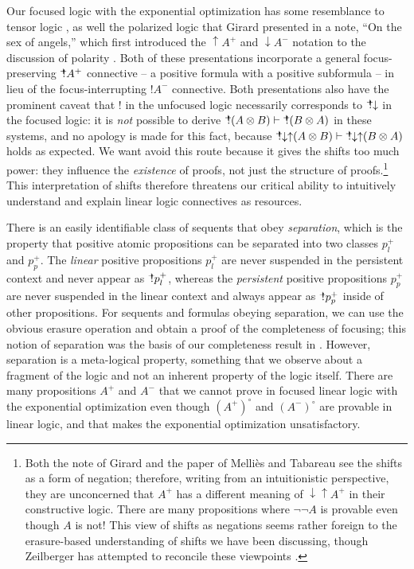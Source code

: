 Our focused logic with the exponential optimization has some resemblance to
tensor logic \cite{mellies10resource}, as well the polarized logic
that Girard presented in a note, ``On the sex of angels,'' which first
introduced the ${\uparrow}A^+$ and ${\downarrow}A^-$ notation to the
discussion of polarity \cite{girard91sex}. Both of these presentations
incorporate a general focus-preserving ${\mbox{\hspace{2pt}$\mathbb !$\hspace{-5pt}$^+$\hspace{-1pt}}}A^+$ connective -- a
positive formula with a positive subformula -- in lieu of the
focus-interrupting ${!}A^-$ connective.  Both presentations also have
the prominent caveat that ${!}$ in the unfocused logic necessarily
corresponds to ${\mbox{\hspace{2pt}$\mathbb !$\hspace{-5pt}$^+$\hspace{-1pt}}}{\downarrow}$ in the focused logic: it is {\it
  not} possible to derive ${\mbox{\hspace{2pt}$\mathbb !$\hspace{-5pt}$^+$\hspace{-1pt}}}(A \otimes B) \vdash {\mbox{\hspace{2pt}$\mathbb !$\hspace{-5pt}$^+$\hspace{-1pt}}}(B
\otimes A)$ in these systems, and no apology is made for this fact,
because ${\mbox{\hspace{2pt}$\mathbb !$\hspace{-5pt}$^+$\hspace{-1pt}}}{\downarrow}{\uparrow}(A \otimes B) \vdash
{\mbox{\hspace{2pt}$\mathbb !$\hspace{-5pt}$^+$\hspace{-1pt}}}{\downarrow}{\uparrow}(B \otimes A)$ holds as expected.  We
want avoid this route because it gives the shifts too much power: they
influence the {\it existence} of proofs, not just the structure of
proofs.\footnote{Both the note of Girard and the paper of Melli{\`e}s
  and Tabareau see the shifts as a form of negation; therefore, 
  writing from an intuitionistic perspective, they
  are unconcerned that $A^+$ has a different meaning of
  ${\downarrow}{\uparrow}A^+$ in their constructive logic. There
  are many propositions where $\neg\neg A$ is provable even though 
  $A$ is not! This view of shifts as negations seems rather
  foreign to the erasure-based understanding of shifts we have been
  discussing, though Zeilberger has attempted to reconcile these
  viewpoints \cite{zeilberger08unity}.} This interpretation of shifts
therefore threatens our critical ability to intuitively understand and
explain linear logic connectives as resources.

There is an easily identifiable class of sequents that obey {\it
  separation}, which is the property that positive atomic propositions
can be separated into two classes $p^+_l$ and $p^+_p$. The {\it
  linear} positive propositions $p^+_l$ are never suspended in the
persistent context and never appear as ${\mbox{\hspace{2pt}$\mathbb !$\hspace{-5pt}$^+$\hspace{-1pt}}}p^+_l$, whereas the
{\it persistent} positive propositions $p^+_p$ are never suspended in
the linear context and always appear as ${\mbox{\hspace{2pt}$\mathbb !$\hspace{-5pt}$^+$\hspace{-1pt}}}p^+_p$ inside of
other propositions. For sequents and formulas obeying separation, we
can use the obvious erasure operation and obtain a proof of the
completeness of focusing; this notion of separation was the basis of
our completeness result in \cite{pfenning09substructural}.  However,
separation is a meta-logical property, something that we observe about
a fragment of the logic and not an inherent property of the logic
itself. There are many propositions $A^+$ and $A^-$ that we cannot
prove in focused linear logic with the exponential optimization even though
$(A^+)^\circ$ and $(A^-)^\circ$ are provable in linear logic, and that
makes the exponential optimization unsatisfactory.

